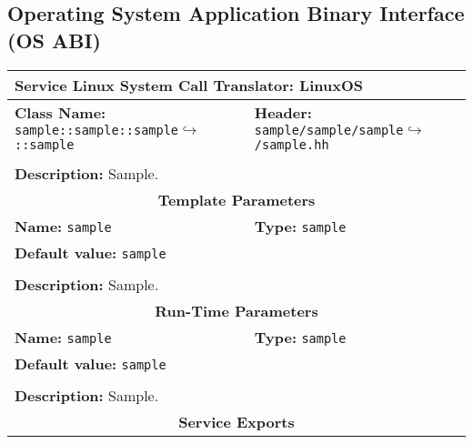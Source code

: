 \subsection{Operating System Application Binary Interface (OS ABI)}

\newpage
\begin{center}
	\begin{tabular}{|p{7.5cm}|p{7.5cm}|}
		\hline
		\multicolumn{2}{|l|}{\textbf{\Large Service Linux System Call Translator: LinuxOS}}\\
		\hline
		\multicolumn{1}{|p{7.5cm}}{\textbf{Class Name:} \newline \texttt{sample::sample::sample}\newline$\hookrightarrow$\texttt{::sample}} & \multicolumn{1}{p{7.5cm}|}{\textbf{Header:} \newline \texttt{sample/sample/sample}\newline$\hookrightarrow$\texttt{/sample.hh}}\\
		\multicolumn{2}{|l|}{}\\
		\multicolumn{2}{|p{15cm}|}{\textbf{Description:} \newline Sample.}\\
		\hline
		\hline
		\multicolumn{2}{|c|}{\textbf{\large Template Parameters}}\\
		\hline
		\multicolumn{1}{|p{7.5cm}}{\textbf{Name:} \texttt{sample}} & \multicolumn{1}{p{7.5cm}|}{\textbf{Type:} \texttt{sample}}\\
		\multicolumn{2}{|p{15cm}|}{\textbf{Default value:} \texttt{sample}}\\
		\multicolumn{2}{|l|}{}\\
		\multicolumn{2}{|p{15cm}|}{\textbf{Description:} \newline Sample.}\\
		\hline
		\hline
		\multicolumn{2}{|c|}{\textbf{\large Run-Time Parameters}}\\
		\hline
		\multicolumn{1}{|p{7.5cm}}{\textbf{Name:} \texttt{sample}} & \multicolumn{1}{p{7.5cm}|}{\textbf{Type:} \texttt{sample}}\\
		\multicolumn{2}{|p{15cm}|}{\textbf{Default value:} \texttt{sample}}\\
		\multicolumn{2}{|l|}{}\\
		\multicolumn{2}{|p{15cm}|}{\textbf{Description:} \newline Sample.}\\
		\hline
		\hline
		\multicolumn{2}{|c|}{\textbf{\large Service Exports}}\\

\end{tabular}
\end{center}
